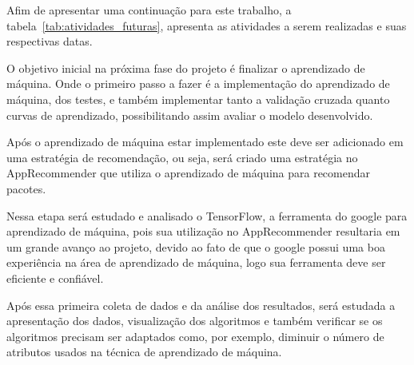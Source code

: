 Afim de apresentar uma continuação para este trabalho, a tabela~\ref{tab:atividades_futuras},
apresenta as atividades a serem realizadas e suas respectivas datas.

\begin{table}[h]
\centering
{}
\caption{Atividades a serem realizadas}
\label{tab:atividades_futuras}
\end{table}

O objetivo inicial na próxima fase do projeto é finalizar o aprendizado
de máquina. Onde o primeiro passo a fazer é a implementação do aprendizado
de máquina, dos testes, e também implementar tanto a validação cruzada quanto
curvas de aprendizado, possibilitando assim avaliar o modelo desenvolvido.

Após o aprendizado de máquina estar implementado este deve ser adicionado
em uma estratégia de recomendação, ou seja, será criado uma estratégia
no AppRecommender que utiliza o aprendizado de máquina para recomendar
pacotes.

Nessa etapa será estudado e analisado o TensorFlow, a ferramenta do
google para aprendizado de máquina, pois sua utilização no AppRecommender
resultaria em um grande avanço ao projeto, devido ao fato de que o
google possui uma boa experiência na área de aprendizado de máquina,
logo sua ferramenta deve ser eficiente e confiável.

Após essa primeira coleta de dados e da análise dos resultados, será
estudada a apresentação dos dados, visualização dos algoritmos e também
verificar se os algoritmos precisam ser adaptados como, por exemplo,
diminuir o número de atributos usados na técnica de aprendizado de máquina.

